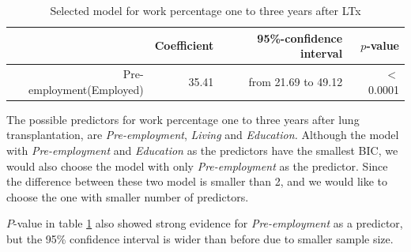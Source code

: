 \documentclass[11pt, a4paper]{article}\usepackage[]{graphicx}\usepackage[]{color}
\begin{document}
{%
\begin{table}[!h]
\centering
\caption{Selected model for work percentage one to three years after LTx} 
\label{tab:tab19}
\begingroup\footnotesize
\begin{tabular}{rrrr}
  \hline
 & Coefficient & 95\%-confidence interval & $p$-value \\ 
  \hline
Pre-employment(Employed) & 35.41 & from 21.69 to 49.12 & $<$ 0.0001 \\ 
   \hline
\end{tabular}
\endgroup
\end{table}


The possible predictors for work percentage one to three years after lung transplantation, are \textit{Pre-employment}, \textit{Living} and \textit{Education.} Although the model with \textit{Pre-employment} and \textit{Education} as the predictors have the smallest BIC, we would also choose the model with only \textit{Pre-employment} as the predictor. Since the difference between these two model is smaller than 2, and we would like to choose the one with smaller number of predictors.

$P$-value in table \ref{tab:tab19} also showed strong evidence for \textit{Pre-employment} as a predictor, but the 95\% confidence interval is wider than before due to smaller sample size.

\clearpage
}
\end{document}
